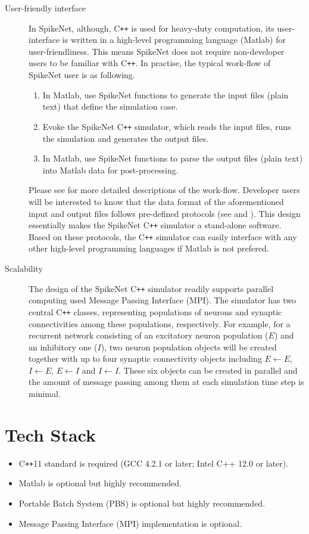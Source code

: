 \documentclass{article}
\begin{document}
\begin{description}
\item [User-friendly interface] In SpikeNet, although, C\texttt{++}  is used for heavy-duty computation, its user-interface is written in a high-level programming language (Matlab) for user-friendliness. This means SpikeNet does not require non-developer users to be familiar with C\texttt{++}. In practise, the typical work-flow of SpikeNet user is as following.
\begin{enumerate}
\item In Matlab, use SpikeNet functions to generate the input files (plain text) that define the simulation case.
\item Evoke the SpikeNet C\texttt{++} simulator, which reads the input files, runs the simulation and generates the output files.
\item In Matlab, use SpikeNet functions to parse the output files (plain text) into Matlab data for post-processing.
\end{enumerate}
Please see  for more detailed descriptions of the work-flow. Developer users will be interested to know that the data format of the aforementioned input and output files follows pre-defined protocols (see  and ). This design essentially makes the SpikeNet C\texttt{++} simulator a stand-alone software. Based on these protocols, the C\texttt{++} simulator can easily interface with any other high-level programming languages if Matlab is not prefered.

\item [Scalability] The design of the SpikeNet C\texttt{++} simulator readily supports parallel computing used Message Passing Interface (MPI). The simulator has two central C\texttt{++} classes, representing populations of neurons and synaptic connectivities among these populations, respectively. For example, for a recurrent network consisting of an excitatory neuron population ($E$) and an inhibitory one ($I$), two neuron population objects will be created together with up to four synaptic connectivity objects including $E\leftarrow E$, $I\leftarrow E$, $E\leftarrow I$ and $I\leftarrow I$. These six objects can be created in parallel and the amount of message passing among them at each simulation time step is minimal.  
\end{description}
 
\section{Tech Stack}
\begin{itemize}
\item C\texttt{++}11 standard is required (GCC 4.2.1 or later; Intel C++ 12.0 or later).
\item Matlab is optional but highly recommended.
\item Portable Batch System (PBS) is optional but highly recommended.
\item Message Passing Interface (MPI) implementation is optional.
\end{itemize}
 
\end{document}
